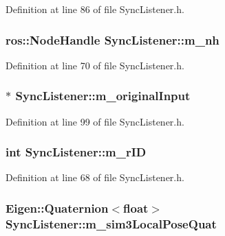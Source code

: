 \-Definition at line 86 of file \-Sync\-Listener.\-h.

\hypertarget{classSyncListener_a11af18cee056cd6558e11246c86d746c}{
\subsubsection[{m\-\_\-nh}]{\setlength{\rightskip}{0pt plus 5cm}ros\-::\-Node\-Handle {\bf \-Sync\-Listener\-::m\-\_\-nh}}}\label{classSyncListener_a11af18cee056cd6558e11246c86d746c}


\-Definition at line 70 of file \-Sync\-Listener.\-h.

\hypertarget{classSyncListener_a143bf4683b219a962032a3b711820850}{
\subsubsection[{m\-\_\-original\-Input}]{$\ast$ {\bf \-Sync\-Listener\-::m\-\_\-original\-Input}}}\label{classSyncListener_a143bf4683b219a962032a3b711820850}


\-Definition at line 99 of file \-Sync\-Listener.\-h.

\hypertarget{classSyncListener_a8a56de9b7444cfe79845217863f50ac4}{
\subsubsection[{m\-\_\-r\-I\-D}]{\setlength{\rightskip}{0pt plus 5cm}int {\bf \-Sync\-Listener\-::m\-\_\-r\-I\-D}}}\label{classSyncListener_a8a56de9b7444cfe79845217863f50ac4}


\-Definition at line 68 of file \-Sync\-Listener.\-h.

\hypertarget{classSyncListener_ab56ff407af05f490da548a5e7150a726}{
\subsubsection[{m\-\_\-sim3\-Local\-Pose\-Quat}]{\setlength{\rightskip}{0pt plus 5cm}\-Eigen\-::\-Quaternion$<$float$>$ {\bf \-Sync\-Listener\-::m\-\_\-sim3\-Local\-Pose\-Quat}}}\label{classSyncListener_ab56ff407af05f490da548a5e7150a726}


